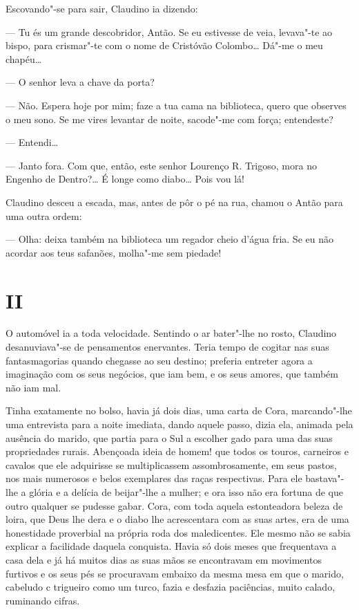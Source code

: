 Escovando"-se para sair, Claudino ia dizendo:

--- Tu és um grande descobridor, Antão. Se eu estivesse de veia,
levava"-te ao bispo, para crismar"-te com o nome de Cristóvão Colombo\ldots{}
Dá"-me o meu chapéu\ldots{}

--- O senhor leva a chave da porta?

--- Não. Espera hoje por mim; faze a tua cama na biblioteca, quero que
observes o meu sono. Se me vires levantar de noite, sacode"-me com força;
entendeste?

--- Entendi\ldots{}

--- Janto fora. Com que, então, este senhor Lourenço R. Trigoso, mora no
Engenho de Dentro?\ldots{} É longe como diabo\ldots{} Pois vou lá!

Claudino desceu a escada, mas, antes de pôr o pé na rua, chamou o Antão
para uma outra ordem:

--- Olha: deixa também na biblioteca um regador cheio d'água fria. Se eu
não acordar aos teus safanões, molha"-me sem piedade!

\section{II}

O automóvel ia a toda velocidade. Sentindo o ar bater"-lhe no rosto,
Claudino desanuviava"-se de pensamentos enervantes. Teria tempo de
cogitar nas suas fantasmagorias quando chegasse ao seu destino; preferia
entreter agora a imaginação com os seus negócios, que iam bem, e os seus
amores, que também não iam mal.

Tinha exatamente no bolso, havia já dois dias, uma carta de Cora,
marcando"-lhe uma entrevista para a noite imediata, dando aquele passo,
dizia ela, animada pela ausência do marido, que partia para o Sul a
escolher gado para uma das suas propriedades rurais. Abençoada ideia de
homem! que todos os touros, carneiros e cavalos que ele adquirisse se
multiplicassem assombrosamente, em seus pastos, nos mais numerosos e
belos exemplares das raças respectivas. Para ele bastava"-lhe a glória e
a delícia de beijar"-lhe a mulher; e ora isso não era fortuna de que
outro qualquer se pudesse gabar. Cora, com toda aquela estonteadora
beleza de loira, que Deus lhe dera e o diabo lhe acrescentara com as
suas artes, era de uma honestidade proverbial na própria roda dos
maledicentes. Ele mesmo não se sabia explicar a facilidade daquela
conquista. Havia só dois meses que frequentava a casa dela e já há
muitos dias as suas mãos se encontravam em movimentos furtivos e os seus
pés se procuravam embaixo da mesma mesa em que o marido, cabeludo c
trigueiro como um turco, fazia e desfazia paciências, muito calado,
ruminando cifras.

